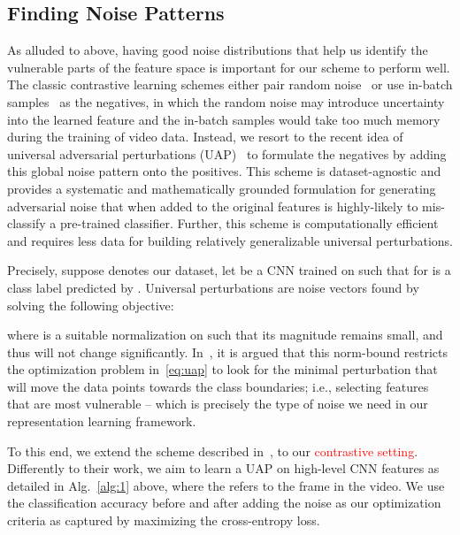 \documentclass[runningheads]{llncs}
\begin{document}
\subsection{Finding Noise Patterns}
As alluded to above, having good noise distributions that help us identify the vulnerable parts of the feature space is important for our scheme to perform well. The classic contrastive learning schemes either pair random noise~\cite{tian2019contrastive,wang2018video} or use in-batch samples~\cite{chen2020simple,he2019momentum} as the negatives, in which the random noise may introduce uncertainty into the learned feature and the in-batch samples would take too much memory during the training of video data. Instead, we resort to the recent idea of universal adversarial perturbations (UAP)~\cite{moosavi2017universal} to formulate the negatives by adding this global noise pattern onto the positives. This scheme is dataset-agnostic and provides a systematic and mathematically grounded formulation for generating adversarial noise that when added to the original features is highly-likely to mis-classify a pre-trained classifier. Further, this scheme is computationally efficient and requires less data for building relatively generalizable universal perturbations.

Precisely, suppose  denotes our dataset, let  be a CNN trained on  such that  for  is a class label predicted by . Universal perturbations are noise vectors  found by solving the following objective:

where  is a suitable normalization on  such that its magnitude remains small, and thus will not change  significantly. In~\cite{moosavi2017universal}, it is argued that this norm-bound restricts the optimization problem in~\eqref{eq:uap} to look for the minimal perturbation  that will move the data points towards the class boundaries; i.e., selecting features that are most vulnerable -- which is precisely the type of noise we need in our representation learning framework. 



To this end, we extend the scheme described in~\cite{moosavi2017universal}, to our \textcolor{red}{contrastive setting}. Differently to their work, we aim to learn a UAP on high-level CNN features as detailed in Alg.~\ref{alg:1} above, where the  refers to the  frame in the  video. We use the classification accuracy before and after adding the noise as our optimization criteria as captured by maximizing the cross-entropy loss.
\end{document}
